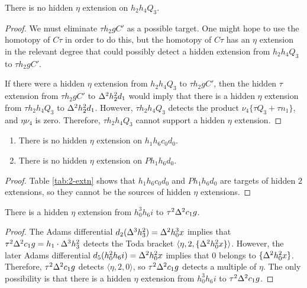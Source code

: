 \begin{lemma}
\label{lem:eta-h2h4Q3}
There is no hidden $\eta$ extension on $h_2 h_4 Q_3$.
\end{lemma}

\begin{proof}
We must eliminate $\tau h_2 g C'$ as a possible target.
One might hope to use the homotopy of $C\tau$ in order to do this,
but the homotopy of $C\tau$ has an $\eta$ extension in the
relevant degree that could possibly detect a hidden extension
from $h_2 h_4 Q_3$ to $\tau h_2 g C'$.


If there were a hidden $\eta$ extension from $h_2 h_4 Q_3$
to $\tau h_2 g C'$, then the hidden $\tau$ extension
from $\tau h_2 g C'$ to $\Delta^2 h_2^2 d_1$ would imply
that there is a hidden $\eta$ extension from
$\tau h_2 h_4 Q_3$ to $\Delta^2 h_2^2 d_1$.
However, $\tau h_2 h_4 Q_3$ detects the product
$\nu_4 \{\tau Q_3 + \tau n_1\}$, and $\eta \nu_4$ is zero.
Therefore,
$\tau h_2 h_4 Q_3$ cannot support a hidden $\eta$ extension.
\end{proof}

\begin{lemma}
\label{lem:eta-h1h6c0d0}
\mbox{}
\begin{enumerate}
\item
{}
There is no hidden $\eta$ extension on $h_1 h_6 c_0 d_0$.
\item
{}
There is no hidden $\eta$ extension on $P h_1 h_6 d_0$.
\end{enumerate}
\end{lemma}

\begin{proof}
Table \ref{tab:2-extn} shows that $h_1 h_6 c_0 d_0$ and
$P h_1 h_6 d_0$ are targets of hidden $2$ extensions, 
so they cannot be the sources of hidden $\eta$ extensions.
\end{proof}

\begin{lemma}
\label{lem:eta-h0^3h6i}
There is a hidden $\eta$ extension from $h_0^3 h_6 i$ to
$\tau^2 \Delta^2 c_1 g$.
\end{lemma}

\begin{proof}
The Adams differential $d_2(\Delta^3 h_3^2) = \Delta^2 h_0^3 x$
implies that
$\tau^2 \Delta^2 c_1 g = h_1 \cdot \Delta^3 h_3^2$ detects the Toda bracket
$\langle \eta, 2, \{\Delta^2 h_0^2 x\} \rangle$.
However, the later Adams differential $d_5(h_0^2 h_6 i) = \Delta^2 h_0^2 x$
implies that $0$ belongs to $\{\Delta^2 h_0^2 x\}$.
Therefore,
$\tau^2 \Delta^2 c_1 g$ detects $\langle \eta, 2, 0 \rangle$,
so $\tau^2 \Delta^2 c_1 g$ detects a multiple of $\eta$.
The only possibility is that there is a hidden $\eta$ extension
from $h_0^3 h_6 i$ to $\tau^2 \Delta^2 c_1 g$.
\end{proof}

